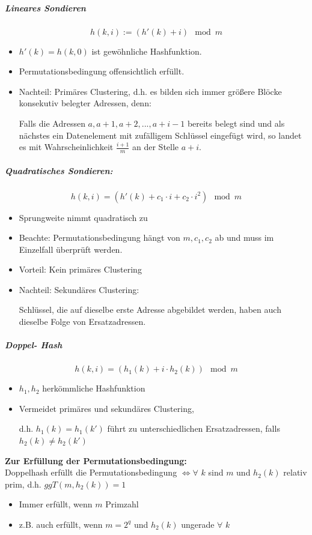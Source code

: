 \documentclass[fleqn]{scrartcl}
\begin{document}
\subparagraph{Lineares Sondieren}
\[h(k, i) := (h'(k) + i) \mod{m}\]
\begin{itemize}
\item $h'(k) = h(k, 0)$ ist gewöhnliche Hashfunktion.
\item Permutationsbedingung offensichtlich erfüllt.
\item Nachteil: Primäres Clustering, d.h. es bilden sich immer größere Blöcke konsekutiv belegter Adressen, denn:

Falls die Adressen $a, a+1, a+2, ..., a+i-1$ bereits belegt sind und als nächstes ein Datenelement mit zufälligem Schlüssel eingefügt wird, so landet es mit Wahrscheinlichkeit $\frac{i+1}{m}$ an der Stelle $a+i$.
\end{itemize}

\subparagraph{Quadratisches Sondieren:}
\[h(k,i) = (h'(k) + c_1 \cdot i + c_2 \cdot i^2) \mod{m} \]
\begin{itemize}
\item Sprungweite nimmt quadratisch zu
\item Beachte: Permutationsbedingung hängt von $m, c_1, c_2$ ab und muss im Einzelfall überprüft werden.
\item Vorteil: Kein primäres Clustering
\item Nachteil: Sekundäres Clustering:

Schlüssel, die auf dieselbe erste Adresse abgebildet werden, haben auch dieselbe Folge von Ersatzadressen.
\end{itemize}

\subparagraph{Doppel- Hash}
\[h(k,i) = (h_1(k) + i \cdot h_2(k)) \mod{m}\]
\begin{itemize}
\item $h_1, h_2$ herkömmliche Hashfunktion
\item Vermeidet primäres und sekundäres Clustering, 

d.h. $h_1(k) = h_1(k')$ führt zu unterschiedlichen Ersatzadressen, falls $h_2(k) \neq h_2(k')$
\end{itemize}
\textbf{Zur Erfüllung der Permutationsbedingung:}\\
Doppelhash erfüllt die Permutationsbedingung $\Leftrightarrow \forall \,\, k$ sind $m$ und $h_2(k)$ relativ prim, d.h. $ggT(m, h_2(k)) = 1$
\begin{itemize}
\item Immer erfüllt, wenn $m$ Primzahl
\item z.B. auch erfüllt, wenn $m = 2^q$ und $h_2(k)$ ungerade $\forall \,\, k$
\end{itemize}
\end{document}
